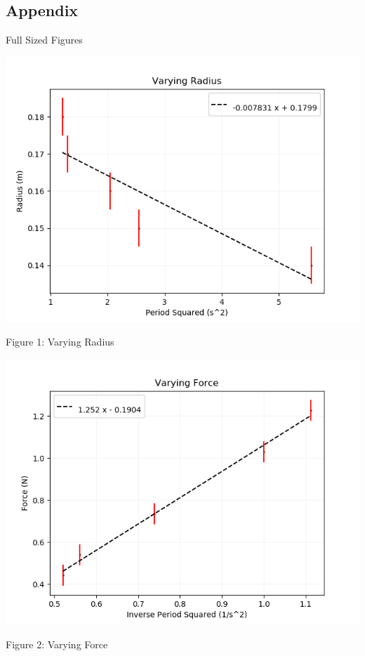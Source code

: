 \documentclass[12pt]{report}
\begin{document}
\begin{flushleft}
\section{Appendix}
\begin{large}
Full Sized Figures \\
\end{large}
\includegraphics{VaryingRadius}
\begin{center}
  Figure 1: Varying Radius
\end{center}
\includegraphics{VaryingForce}
\begin{center}
  Figure 2: Varying Force
\end{center}
\begin{large}
\newpage

\end{large}
\end{flushleft}
\end{document}

